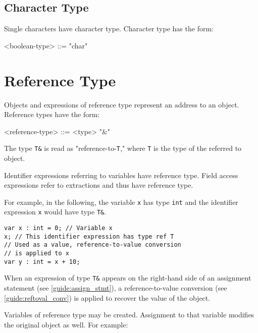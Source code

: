 \subsection{Character Type} \label{guide:char_type}

Single characters have character type. Character type has the form: 

\begin{minip}
\begin{grammar}
<boolean-type> ::= "char"
\end{grammar}
\end{minip}

\section{Reference Type} \label{guide:ref_type}

Objects and expressions of reference type represent an address to an object.  Reference types have the form:

\begin{minip}
\begin{grammar}
<reference-type> ::= <type> "\&" 
\end{grammar}
\end{minip}

The type \texttt{T\&} is read as "reference-to-\texttt{T}," where \texttt{T} is the type of the referred to object.

Identifier expressions referring to variables have reference type. Field access expressions refer to extractions and thus have reference type.

For example, in the following, the variable \texttt{x} has type \texttt{int} and the identifier expression \texttt{x} would have type \texttt{T\&}.

\begin{minip}
\begin{lstlisting}
var x : int = 0; // Variable x
x; // This identifier expression has type ref T
// Used as a value, reference-to-value conversion
// is applied to x
var y : int = x + 10;
\end{lstlisting}
\end{minip}

When an expression of type \texttt{T\&} appears on the right-hand side of an
assignment statement (see \ref{guide:assign_stmt}), a reference-to-value
conversion (see \ref{guide:reftoval_conv}) is applied to recover the value of the object.

Variables of reference type may be created. Assignment to that variable modifies the original object as well. For example:


